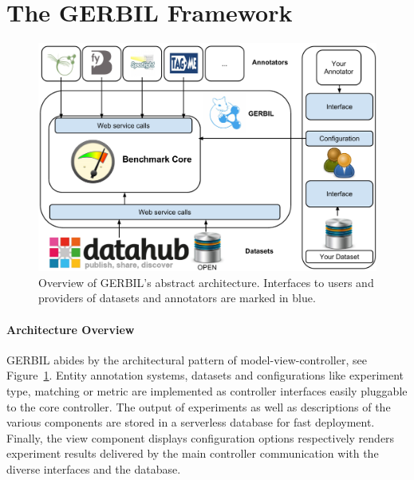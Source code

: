 \section{The GERBIL Framework}
\label{sec:architecture}
\begin{figure}[htb!]
\centering
\includegraphics[width=\linewidth]{part_02/benchmarking/WWW_GERBIL/online_annotator_benchmark.pdf}
\caption{Overview of GERBIL's abstract architecture. Interfaces to users and providers of datasets and annotators are marked in blue.
}
\label{fig:architecture}
\end{figure}


\paragraph{Architecture Overview}
GERBIL abides by the architectural pattern of model-view-controller, see Figure~\ref{fig:architecture}.
Entity annotation systems, datasets and configurations like experiment type, matching or metric are implemented as controller interfaces easily pluggable to the core controller. 
The output of experiments as well as descriptions of the various components are stored in a serverless database for fast deployment. %
Finally, the view component displays configuration options respectively renders experiment results delivered by the main controller communication with the diverse interfaces and the database.

